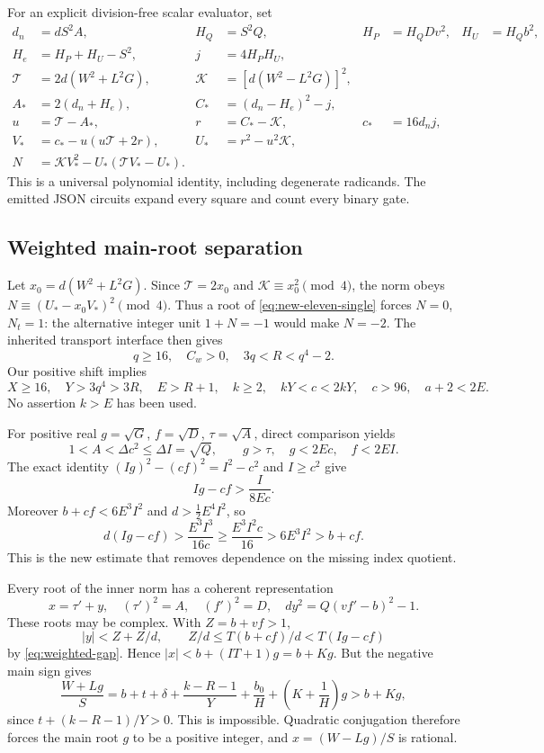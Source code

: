 For an explicit division-free scalar evaluator, set
\begin{align*}
 d_n&=dS^2A,&H_Q&=S^2Q,&H_P&=H_QDv^2,&H_U&=H_Qb^2,\\
 H_e&=H_P+H_U-S^2,&j&=4H_PH_U,\\
 \mathcal T&=2d(W^2+L^2G),&\mathcal K&=[d(W^2-L^2G)]^2,\\
 A_*&=2(d_n+H_e),&C_*&=(d_n-H_e)^2-j,\\
 u&=\mathcal T-A_*,&r&=C_*-\mathcal K,&c_*&=16d_nj,\\
 V_*&=c_*-u(u\mathcal T+2r),&U_*&=r^2-u^2\mathcal K,\\
 N&=\mathcal K V_*^2-U_*(\mathcal T V_*-U_*).
\end{align*}
This is a universal polynomial identity, including degenerate radicands.
The emitted JSON circuits expand every square and count every binary gate.

\subsection{Weighted main-root separation}
Let $x_0=d(W^2+L^2G)$. Since $\mathcal T=2x_0$ and
$\mathcal K\equiv x_0^2\pmod4$, the norm obeys
$N\equiv(U_*-x_0V_*)^2\pmod4$.
Thus a root of \eqref{eq:new-eleven-single} forces $N=0$, $N_t=1$:
the alternative integer unit $1+N=-1$ would make $N=-2$.
The inherited transport interface then gives
\[
 q\ge16,\quad C_w>0,\quad 3q<R<q^4-2.
\]
Our positive shift implies
\[
 X\ge16,\quad Y>3q^4>3R,\quad E>R+1,\quad
 k\ge2,\quad kY<c<2kY,\quad c>96,\quad a+2<2E.
\]
No assertion $k>E$ has been used.

For positive real $g=\sqrt G$, $f=\sqrt D$, $\tau=\sqrt A$, direct
comparison yields
\[
 1<A<\Delta c^2\le\Delta I=\sqrt Q,\qquad
 g>\tau,\quad g<2Ec,\quad f<2EI.
\]
The exact identity $(Ig)^2-(cf)^2=I^2-c^2$ and $I\ge c^2$ give
\[
 Ig-cf>\frac{I}{8Ec}.
\]
Moreover $b+cf<6E^3I^2$ and $d>\tfrac12 E^4I^2$, so
\begin{equation}\label{eq:weighted-gap}
 d(Ig-cf)>\frac{E^3I^3}{16c}
 \ge\frac{E^3I^2c}{16}>6E^3I^2>b+cf.
\end{equation}
This is the new estimate that removes dependence on the missing index
quotient.

Every root of the inner norm has a coherent representation
\[
 x=\tau'+y,\quad (\tau')^2=A,\quad(f')^2=D,\quad
 dy^2=Q(vf'-b)^2-1.
\]
These roots may be complex. With $Z=b+vf>1$,
\[
 |y|<Z+Z/d,\qquad Z/d\le T(b+cf)/d<T(Ig-cf)
\]
by \eqref{eq:weighted-gap}. Hence $|x|<b+(IT+1)g=b+Kg$.
But the negative main sign gives
\[
 \frac{W+Lg}{S}
 =b+t+\delta+\frac{k-R-1}{Y}+\frac{b_0}{H}
       +\left(K+\frac1H\right)g>b+Kg,
\]
since $t+(k-R-1)/Y>0$. This is impossible. Quadratic conjugation
therefore forces the main root $g$ to be a positive integer, and
$x=(W-Lg)/S$ is rational.


